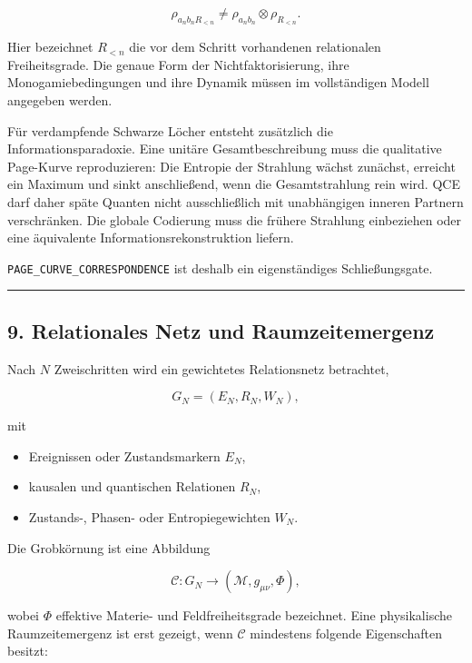 \documentclass[
  11pt,
  a4paper,
]{article}
\providecommand{\tightlist}{%
  \setlength{\itemsep}{0pt}\setlength{\parskip}{0pt}}
\begin{document}
\[
\rho_{a_nb_nR_{<n}}
\neq
\rho_{a_nb_n}\otimes\rho_{R_{<n}}.
\]

Hier bezeichnet \(R_{<n}\) die vor dem Schritt vorhandenen relationalen
Freiheitsgrade. Die genaue Form der Nichtfaktorisierung, ihre
Monogamiebedingungen und ihre Dynamik müssen im vollständigen Modell
angegeben werden.

Für verdampfende Schwarze Löcher entsteht zusätzlich die
Informationsparadoxie. Eine unitäre Gesamtbeschreibung muss die
qualitative Page-Kurve reproduzieren: Die Entropie der Strahlung wächst
zunächst, erreicht ein Maximum und sinkt anschließend, wenn die
Gesamtstrahlung rein wird. QCE darf daher späte Quanten nicht
ausschließlich mit unabhängigen inneren Partnern verschränken. Die
globale Codierung muss die frühere Strahlung einbeziehen oder eine
äquivalente Informationsrekonstruktion liefern.

\texttt{PAGE\_CURVE\_CORRESPONDENCE} ist deshalb ein eigenständiges
Schließungsgate.

\begin{center}\rule{0.5\linewidth}{0.5pt}\end{center}

\subsection{9. Relationales Netz und
Raumzeitemergenz}\label{relationales-netz-und-raumzeitemergenz}

Nach \(N\) Zweischritten wird ein gewichtetes Relationsnetz betrachtet,

\[
G_N=(E_N,R_N,W_N),
\]

mit

\begin{itemize}
\tightlist
\item
  Ereignissen oder Zustandsmarkern \(E_N\),
\item
  kausalen und quantischen Relationen \(R_N\),
\item
  Zustands-, Phasen- oder Entropiegewichten \(W_N\).
\end{itemize}

Die Grobkörnung ist eine Abbildung

\[
\mathcal C:G_N\rightarrow(\mathcal M,g_{\mu\nu},\Phi),
\]

wobei \(\Phi\) effektive Materie- und Feldfreiheitsgrade bezeichnet.
Eine physikalische Raumzeitemergenz ist erst gezeigt, wenn
\(\mathcal C\) mindestens folgende Eigenschaften besitzt:
\end{document}
